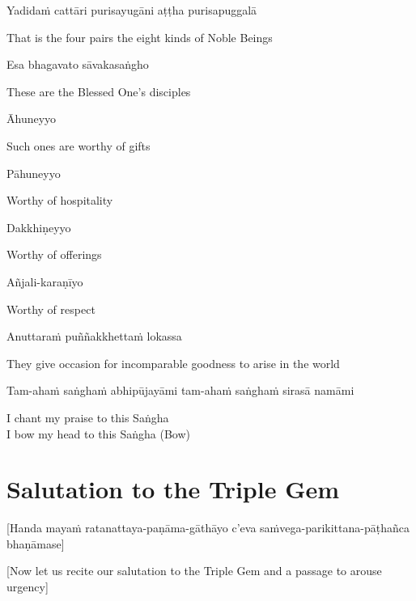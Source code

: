 Yadidaṁ cattāri purisayugāni aṭṭha purisapuggalā

\begin{cprenglish}
  That is the four pairs the eight kinds of Noble Beings
\end{cprenglish}

Esa bhagavato sāvakasaṅgho

\begin{cprenglish}
  These are the Blessed One’s disciples
\end{cprenglish}

Āhuneyyo

\begin{cprenglish}
  Such ones are worthy of gifts
\end{cprenglish}

Pāhuneyyo

\begin{cprenglish}
  Worthy of hospitality
\end{cprenglish}

Dakkhiṇeyyo

\begin{cprenglish}
  Worthy of offerings
\end{cprenglish}

Añjali-karaṇīyo

\begin{cprenglish}
  Worthy of respect
\end{cprenglish}

Anuttaraṁ puññakkhettaṁ lokassa

\begin{cprenglish}
  They give occasion for incomparable goodness to arise in the world
\end{cprenglish}

Tam-ahaṁ saṅghaṁ abhipūjayāmi tam-ahaṁ saṅghaṁ sirasā namāmi

\begin{cprenglish}
  I chant my praise to this Saṅgha\\
  I bow my head to this Saṅgha \hfill{(Bow)}
\end{cprenglish}

\section{Salutation to the Triple Gem}
\label{salutation}

\begin{center}
  [Handa mayaṁ ratanattaya-paṇāma-gāthāyo c'eva saṁvega-parikittana-pāṭhañca bhaṇāmase]
\end{center}
\begin{center}
  [Now let us recite our salutation to the Triple Gem and a passage to arouse urgency]
\end{center}


